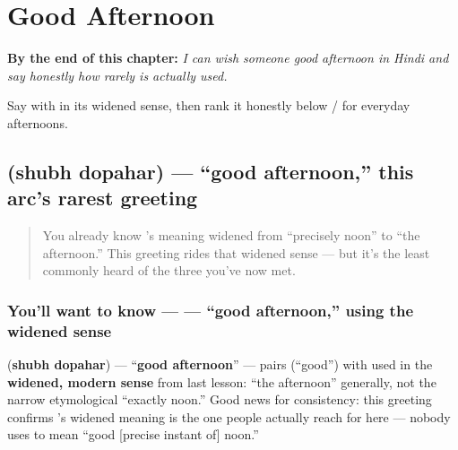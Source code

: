 
\chapter{Good Afternoon}
\label{ch:hi-good-afternoon}

\begin{chapteropening}
\textbf{By the end of this chapter:} \emph{I can wish someone good afternoon in Hindi and say honestly how rarely   is actually used.}

Say   with  in its widened sense, then rank it honestly below / for everyday afternoons.
\end{chapteropening}

\section[\texorpdfstring{\hi{शुभ} \hi{दोपहर} (shubh dopahar)}{शुभ दोपहर (shubh dopahar)}]{  (shubh dopahar) — \textquotedblleft{}good afternoon,\textquotedblright{} this arc's rarest greeting}

\label{lesson:HI-C33-shubh-dopahar}



\begin{quote}
You already know 's meaning widened from \textquotedblleft{}precisely noon\textquotedblright{} to \textquotedblleft{}the afternoon.\textquotedblright{} This greeting rides that widened sense — but it's the least commonly heard of the three you've now met.
\end{quote}

\subsection*{You'll want to know —   — \textquotedblleft{}good afternoon,\textquotedblright{} using the widened sense}
\textbf{ } (\textbf{shubh dopahar}) — \textquotedblleft{}\textbf{good afternoon}\textquotedblright{} — pairs \textbf{} (\textquotedblleft{}good\textquotedblright{}) with \textbf{} used in the \textbf{widened, modern sense} from last lesson: \textquotedblleft{}the afternoon\textquotedblright{} generally, not the narrow etymological \textquotedblleft{}exactly noon.\textquotedblright{} Good news for consistency: this greeting confirms 's widened meaning is the one people actually reach for here — nobody uses   to mean \textquotedblleft{}good {[}precise instant of{]} noon.\textquotedblright{}

